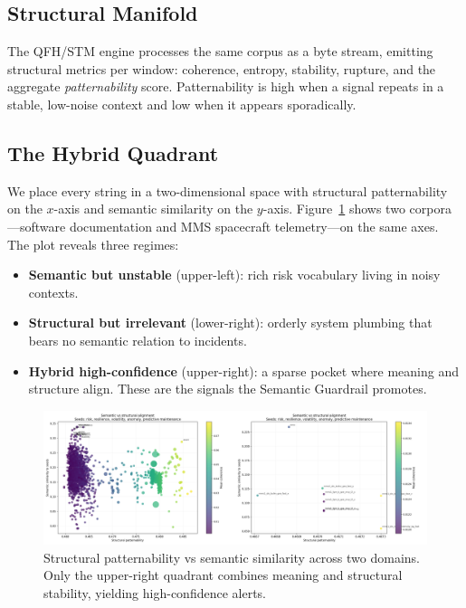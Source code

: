 \documentclass[11pt]{article}
\begin{document}
\subsection{Structural Manifold}
The QFH/STM engine processes the same corpus as a byte stream, emitting
structural metrics per window: coherence, entropy, stability, rupture, and the
aggregate \emph{patternability} score. Patternability is high when a signal
repeats in a stable, low-noise context and low when it appears sporadically.

\subsection{The Hybrid Quadrant}
We place every string in a two-dimensional space with structural patternability
on the $x$-axis and semantic similarity on the $y$-axis. Figure~\ref{fig:combined}
shows two corpora---software documentation and MMS spacecraft telemetry---on the
same axes. The plot reveals three regimes:
\begin{itemize}
  \item \textbf{Semantic but unstable} (upper-left): rich risk vocabulary living in
        noisy contexts.
  \item \textbf{Structural but irrelevant} (lower-right): orderly system plumbing
        that bears no semantic relation to incidents.
  \item \textbf{Hybrid high-confidence} (upper-right): a sparse pocket where
        meaning and structure align. These are the signals the Semantic Guardrail
        promotes.
\end{itemize}
\begin{figure}[t]
  \centering
  \includegraphics[width=0.95\linewidth]{figures/semantic_bridge_combined.png}
  \caption{Structural patternability vs semantic similarity across two domains.
           Only the upper-right quadrant combines meaning and structural
           stability, yielding high-confidence alerts.}
  \label{fig:combined}
\end{figure}
\end{document}
